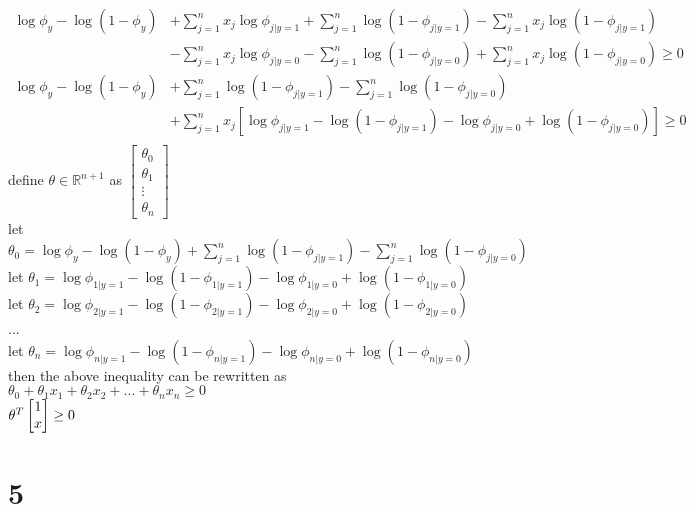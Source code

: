 \documentclass[11pt]{article}
\begin{document}
\begin{align*}
    \log \phi_y - \log (1 - \phi_y) &+ \sum_{j=1}^n x_j \log \phi_{j|y=1} + \sum_{j=1}^n \log (1 - \phi_{j|y=1}) - \sum_{j=1}^n x_j \log (1 - \phi_{j|y=1}) \\
                                    &- \sum_{j=1}^n x_j \log \phi_{j|y=0} - \sum_{j=1}^n \log (1 - \phi_{j|y=0}) + \sum_{j=1}^n x_j \log (1 - \phi_{j|y=0}) \geq 0 \\
    \log \phi_y - \log (1 - \phi_y) &+ \sum_{j=1}^n \log (1 - \phi_{j|y=1}) - \sum_{j=1}^n \log (1 - \phi_{j|y=0}) \\
                                    &+ \sum_{j=1}^n x_j [ \log \phi_{j|y=1} - \log (1 - \phi_{j|y=1}) - \log \phi_{j|y=0} + \log ( 1 - \phi_{j|y=0})] \geq 0 \\
\end{align*}
define $\theta \in \mathbb{R}^{n+1}$ as 
$
\begin{bmatrix}
    \theta_0 \\
    \theta_1 \\
    \vdots \\
    \theta_n
\end{bmatrix}
$ \\

let $\theta_0 = \log \phi_y - \log (1 - \phi_y) + \sum_{j=1}^n \log (1-\phi_{j|y=1}) - \sum_{j=1}^n \log (1-\phi_{j|y=0})$ \\
let $\theta_1 = \log \phi_{1|y=1} - \log (1-\phi_{1|y=1}) - \log \phi_{1|y=0} + \log (1 - \phi_{1|y=0})$ \\
let $\theta_2 = \log \phi_{2|y=1} - \log (1-\phi_{2|y=1}) - \log \phi_{2|y=0} + \log (1 - \phi_{2|y=0})$ \\
... \\
let $\theta_n = \log \phi_{n|y=1} - \log (1-\phi_{n|y=1}) - \log \phi_{n|y=0} + \log (1 - \phi_{n|y=0})$ \\

then the above inequality can be rewritten as \\

$\theta_0 + \theta_1 x_1 + \theta_2 x_2 + ... + \theta_n x_n \geq 0$ \\

$\theta^{T} \begin{bmatrix} 1 \\ x \\ \end{bmatrix} \geq 0$ \\

\section*{5}
\end{document}
